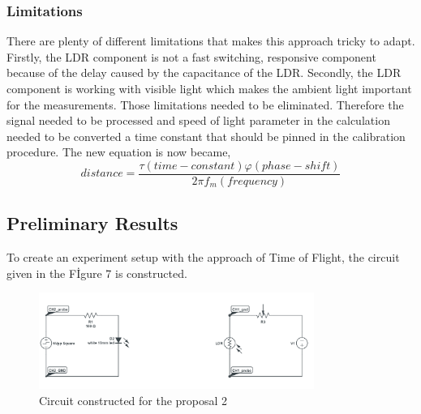 \documentclass[letterpaper,12pt]{article}
\begin{document}
\subsubsection{Limitations}
There are plenty of different limitations that makes this approach tricky to adapt. Firstly, the LDR component is not a fast switching, responsive component because of the delay caused by the capacitance of the LDR. Secondly, the LDR component is working with visible light which makes the ambient light important for the measurements. Those limitations needed to be eliminated. Therefore the signal needed to be processed and speed of light parameter in the calculation needed to be converted a time constant that should be pinned in the calibration procedure. The new equation is now became,
\[distance = \frac{  \tau (time-constant)  \varphi (phase-shift)  }{2 \pi f_m (frequency)}\]

\subsection{Preliminary Results}
To create an experiment setup with the approach of Time of Flight, the circuit given in the Fİgure 7 is constructed.
\begin{figure}[H]
	\centering
   \includegraphics[width=0.8\textwidth]{circuit2.png}
   \caption{Circuit constructed for the proposal 2}
\end{figure} 
\end{document}
